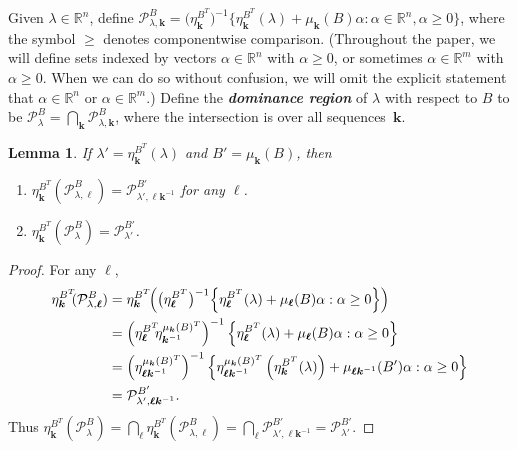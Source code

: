 \documentclass{amsart}
\newtheorem{lemma}[proposition]{Lemma}
\theoremstyle{definition}
\theoremstyle{remark}
\numberwithin{equation}{section}
\newcommand{\newword}[1]{\textbf{\emph{#1}}}
\newcommand{\reals}{\mathbb R}
\newcommand{\set}[1]{{\lbrace #1 \rbrace}}
\newcommand{\sett}[1]{{\bigl\lbrace #1 \bigr\rbrace}}
\newcommand{\settt}[1]{{\Bigl\lbrace #1 \Bigr\rbrace}}
\newcommand{\0}{{\mathbf{0}}}
\newcommand{\kk}{{\boldsymbol{k}}}
\renewcommand{\ll}{{\boldsymbol\ell}}
\renewcommand{\P}{\mathcal{P}}
\begin{document}
Given $\lambda\in\reals^n$, define $\P^B_{\lambda,\kk}=\bigl(\eta_{\kk}^{B^T}\bigr)^{-1}\sett{\eta_\kk^{B^T}(\lambda)+\mu_\kk(B)\alpha:\alpha\in\reals^n,\alpha\ge0}$, where the symbol $\ge$ denotes componentwise comparison.
(Throughout the paper, we will define sets indexed by vectors $\alpha\in\reals^n$ with $\alpha\ge0$, or sometimes $\alpha\in\reals^m$ with $\alpha\ge0$.
When we can do so without confusion, we will omit the explicit statement that $\alpha\in\reals^n$ or $\alpha\in\reals^m$.)
Define the \newword{dominance region} of $\lambda$ with respect to $B$ to be $\P^B_\lambda=\bigcap_\kk\P^B_{\lambda,\kk}$, where the intersection is over all sequences~$\kk$.
\begin{lemma}\label{shift}
If $\lambda'=\eta^{B^T}_\kk(\lambda)$ and $B'=\mu_\kk(B)$, then 
\begin{enumerate}[label=\bf\arabic*., ref=\arabic*]
\item \label{shift one}
$\eta^{B^T}_\kk\!\!(\P^B_{\lambda,\ll})=\P^{B'}_{\lambda',\ll\kk^{-1}}$ for any $\ll$.
\item \label{shift all}
$\eta^{B^T}_\kk\!\!(\P^B_\lambda)=\P^{B'}_{\lambda'}$.
\end{enumerate}
\end{lemma}
\begin{proof}
For any $\ll$,
\begin{align*}
\eta^{B^T}_\kk\!\!(\P^B_{\lambda,\ll})
&=\eta^{B^T}_\kk\!\!\left(\bigl(\eta_{\ll}^{B^T}\bigr)^{-1}\settt{\eta_\ll^{B^T}(\lambda)+\mu_\ll(B)\alpha:\alpha\ge0}\right)\\
&=\left(\eta^{B^T}_\ll\!\!\eta_{\kk^{-1}}^{\mu_\kk(B)^T}\right)^{-1}\settt{\eta_\ll^{B^T}(\lambda)+\mu_\ll(B)\alpha:\alpha\ge0}\\
&=\left(\eta^{\mu_\kk(B)^T}_{\ll\kk^{-1}}\right)^{-1}\settt{\eta^{\mu_\kk(B)^T}_{\ll\kk^{-1}}\left(\eta^{B^T}_\kk(\lambda)\right)+\mu_{\ll\kk^{-1}}(B')\alpha:\alpha\ge0}\\
&=\P^{B'}_{\lambda',\ll\kk^{-1}}.
\end{align*}
  Thus $\eta^{B^T}_\kk\!\!(\P^B_\lambda)=\bigcap_\ll\eta^{B^T}_\kk\!\!(\P^B_{\lambda,\ll})=\bigcap_\ll\P^{B'}_{\lambda',\ll\kk^{-1}}=\P^{B'}_{\lambda'}$.
\end{proof}
\end{document}
